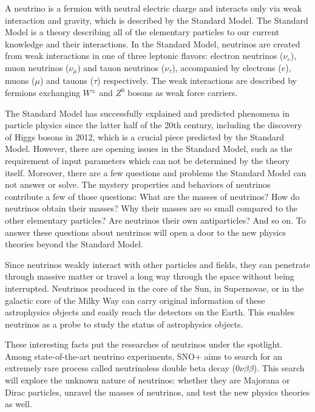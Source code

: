 
A neutrino is a fermion with neutral electric charge and interacts only via weak interaction and gravity, which is described by the Standard Model. The Standard Model is a theory describing all of the elementary particles to our current knowledge and their interactions.
In the Standard Model, neutrinos are created from weak interactions in one of three leptonic flavors:
electron neutrinos ($\nu_e$), muon neutrinos ($\nu_\mu$) and tauon neutrinos ($\nu_\tau$), accompanied by electrons ($e$), muons ($\mu$) and tauons ($\tau$) respectively. The weak interactions are described by fermions exchanging $W^{\pm}$ and $Z^0$ bosons as weak force carriers.

The Standard Model has successfully explained and predicted phenomena in particle physics since the latter half of the 20th century, including the discovery of Higgs bosons in 2012, which is a crucial piece predicted by the Standard Model. However, there are opening issues in the Standard Model, such as the requirement of input parameters which can not be determined by the theory itself. Moreover, there are a few questions and problems the Standard Model can not answer or solve. The mystery properties and behaviors of neutrinos contribute a few of those questions: What are the masses of neutrinos? How do neutrinos obtain their masses? Why their masses are so small compared to the other elementary particles? Are neutrinos their own antiparticles? And so on. To answer these questions about neutrinos will open a door to the new physics theories beyond the Standard Model.

Since neutrinos weakly interact with other particles and fields, they can penetrate through massive matter or travel a long way through the space without being interrupted. Neutrinos produced in the core of the Sun, in Supernovae, or in the galactic core of the Milky Way can carry original information of these astrophysics objects and easily reach the detectors on the Earth. This enables neutrinos as a probe to study the status of astrophysics objects.

These interesting facts put the researches of neutrinos under the spotlight. Among state-of-the-art neutrino experiments, SNO+ aims to search for an extremely rare process called neutrinoless double beta decay ($0\nu\beta\beta$). This search will explore the unknown nature of neutrinos: whether they are Majorana or Dirac particles, unravel the masses of neutrinos, and test the new physics theories as well.

